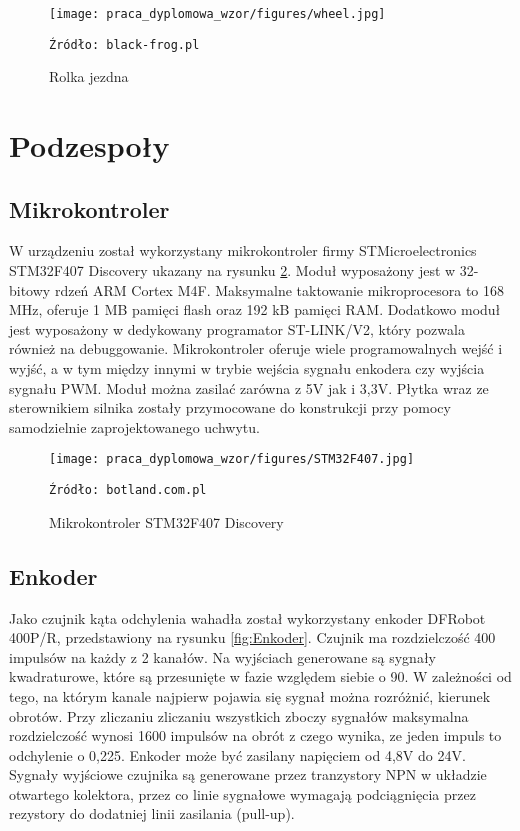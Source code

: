 \begin{figure}
    \centering
    \texttt{[image: praca\_dyplomowa\_wzor/figures/wheel.jpg]}
    \caption{Rolka jezdna}
    \texttt{Źródło: black-frog.pl}
    \label{fig:Rolka}
\end{figure}

\section{Podzespoły}

\subsection{Mikrokontroler}
W urządzeniu został wykorzystany mikrokontroler firmy STMicroelectronics STM32F407 Discovery ukazany na rysunku \ref{fig:STM32}. Moduł wyposażony jest w 32-bitowy rdzeń ARM Cortex M4F. Maksymalne taktowanie mikroprocesora to 168 MHz, oferuje 1 MB pamięci flash oraz 192 kB pamięci RAM. Dodatkowo moduł jest wyposażony w dedykowany programator ST-LINK/V2, który pozwala również na debuggowanie. Mikrokontroler oferuje wiele programowalnych wejść i wyjść, a w tym między innymi w trybie wejścia sygnału enkodera czy wyjścia sygnału PWM. Moduł można zasilać zarówna z 5V jak i 3,3V. Płytka wraz ze sterownikiem silnika zostały przymocowane do konstrukcji przy pomocy samodzielnie zaprojektowanego uchwytu. 

\begin{figure}
    \centering
    \texttt{[image: praca\_dyplomowa\_wzor/figures/STM32F407.jpg]}
    \caption{Mikrokontroler STM32F407 Discovery}
    \texttt{Źródło: botland.com.pl}
    \label{fig:STM32}
\end{figure}

\subsection{Enkoder}
Jako czujnik kąta odchylenia wahadła został wykorzystany enkoder DFRobot 400P/R, przedstawiony na rysunku \ref{fig:Enkoder}. Czujnik ma rozdzielczość 400 impulsów na każdy z 2 kanałów. Na wyjściach generowane są sygnały kwadraturowe, które są przesunięte w fazie względem siebie o 90\degree. W zależności od tego, na którym kanale najpierw pojawia się sygnał można rozróżnić, kierunek obrotów. Przy zliczaniu zliczaniu wszystkich zboczy sygnałów maksymalna rozdzielczość wynosi 1600 impulsów na obrót z czego wynika, ze jeden impuls to odchylenie o 0,225\degree. Enkoder może być zasilany napięciem od 4,8V do 24V. Sygnały wyjściowe czujnika są generowane przez tranzystory NPN w układzie otwartego kolektora, przez co linie sygnałowe wymagają podciągnięcia przez rezystory do dodatniej linii zasilania (pull-up).

